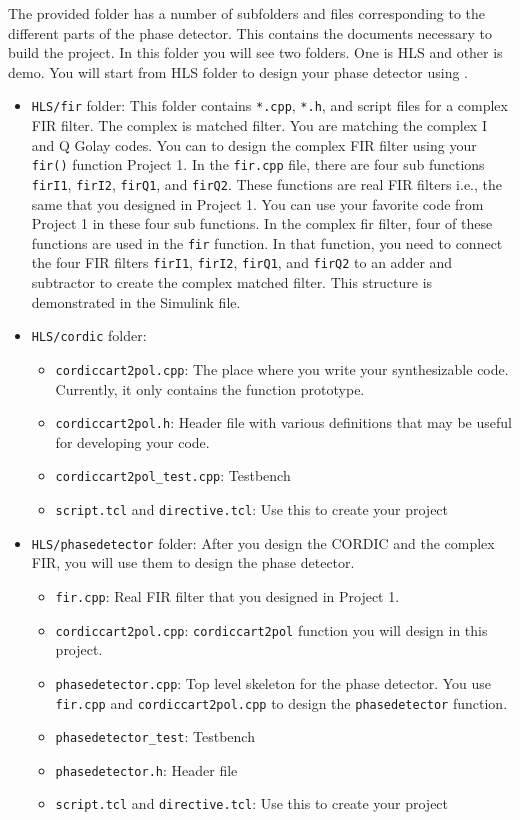 The provided folder has a number of subfolders and files corresponding to the different parts of the phase detector.  This contains the documents necessary to build the project. In this folder you will see two folders. One is HLS and other is demo. You will start from HLS folder to design your phase detector using \VHLS.
\begin{itemize} 
\item \texttt{HLS/fir} folder: This folder contains \texttt{*.cpp}, \texttt{*.h}, and script files for a complex FIR filter. The complex is matched filter. You are matching the complex I and Q Golay codes. You can to design the complex FIR filter using your \texttt{fir()} function Project 1. In the \texttt{fir.cpp} file, there are four sub functions \texttt{firI1}, \texttt{firI2}, \texttt{firQ1}, and \texttt{firQ2}. These functions are real FIR filters i.e., the same that you designed in Project 1. You can use your favorite code from Project 1 in these four sub functions. In the complex fir filter, four of these functions are used in the \texttt{fir} function. In that function, you need to connect the four FIR filters \texttt{firI1}, \texttt{firI2}, \texttt{firQ1}, and \texttt{firQ2} to an adder and subtractor to create the complex matched filter. This structure is demonstrated in the Simulink file. 

\item \texttt{HLS/cordic} folder:
\begin{itemize}
\item \texttt{cordiccart2pol.cpp}: The place where you write your synthesizable code. Currently, it only contains the function prototype. 
\item \texttt{cordiccart2pol.h}: Header file with various definitions that may be useful for developing your code.
\item \texttt{cordiccart2pol\_test.cpp}: Testbench
\item \texttt{script.tcl} and \texttt{directive.tcl}: Use this to create your project
\end{itemize}

\item \texttt{HLS/phasedetector} folder: After you design the CORDIC and the complex FIR, you will use them to design the phase detector. 
\begin{itemize}
\item \texttt{fir.cpp}:  Real FIR filter that you designed in Project 1. 
\item \texttt{cordiccart2pol.cpp}: \texttt{cordiccart2pol} function you will design in this project.
\item \texttt{phasedetector.cpp}: Top level skeleton for the phase detector. You use \texttt{fir.cpp} and \texttt{cordiccart2pol.cpp} to design the \texttt{phasedetector} function. 
\item \texttt{phasedetector\_test}: Testbench
\item \texttt{phasedetector.h}: Header file
\item \texttt{script.tcl} and \texttt{directive.tcl}: Use this to create your project
\end{itemize}


\end{itemize}
